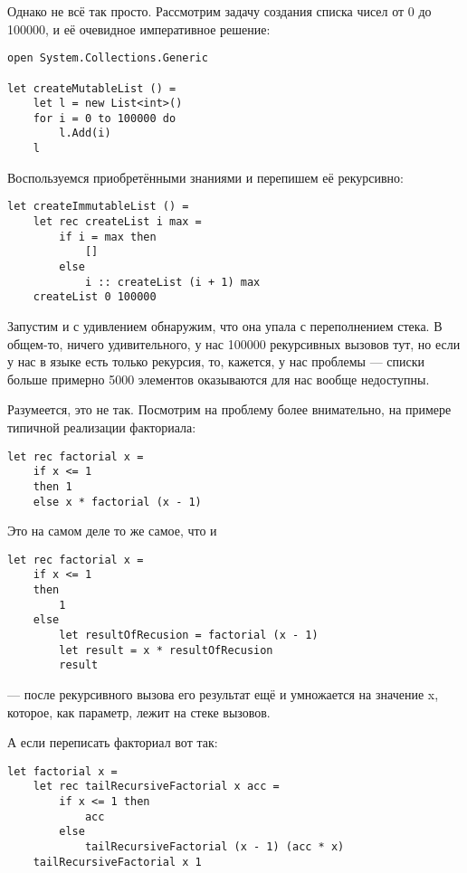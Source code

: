 \documentclass[a5paper]{article}
\begin{document}
Однако не всё так просто. Рассмотрим задачу создания списка чисел от 0 до 100000, и её очевидное императивное решение:

\begin{verbatim}
open System.Collections.Generic

let createMutableList () =
    let l = new List<int>()
    for i = 0 to 100000 do
        l.Add(i)
    l
\end{verbatim}

Воспользуемся приобретёнными знаниями и перепишем её рекурсивно:

\begin{verbatim}
let createImmutableList () =
    let rec createList i max =
        if i = max then
            []
        else
            i :: createList (i + 1) max
    createList 0 100000
\end{verbatim}

Запустим и с удивлением обнаружим, что она упала с переполнением стека. В общем-то, ничего удивительного, у нас 100000 рекурсивных вызовов тут, но если у нас в языке есть только рекурсия, то, кажется, у нас проблемы --- списки больше примерно 5000 элементов оказываются для нас вообще недоступны.

Разумеется, это не так. Посмотрим на проблему более внимательно, на примере типичной реализации факториала:

\begin{verbatim}
let rec factorial x =
    if x <= 1
    then 1 
    else x * factorial (x - 1)
\end{verbatim}

Это на самом деле то же самое, что и 

\begin{verbatim}
let rec factorial x =
    if x <= 1
    then
        1
    else
        let resultOfRecusion = factorial (x - 1)
        let result = x * resultOfRecusion
        result
\end{verbatim}

--- после рекурсивного вызова его результат ещё и умножается на значение x, которое, как параметр, лежит на стеке вызовов.

А если переписать факториал вот так:

\begin{verbatim}
let factorial x =
    let rec tailRecursiveFactorial x acc =
        if x <= 1 then
            acc
        else
            tailRecursiveFactorial (x - 1) (acc * x)
    tailRecursiveFactorial x 1
\end{verbatim}
\end{document}
